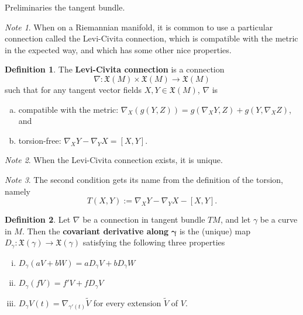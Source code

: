 \documentclass{article}
\newcommand{\fn}[3]{#1 \colon #2 \rightarrow #3}
\theoremstyle{definition}
\newtheorem{definition}{Definition}[section]
\theoremstyle{remark}
\newtheorem{remark}{Note}[section]
\begin{document}
\begin{section}{Preliminaries}
  the tangent bundle.
  \begin{remark}
    When on a Riemannian manifold, it is common to use a particular connection
    called the Levi-Civita connection, which is compatible with the metric in
    the expected way, and which has some other nice properties.
  \end{remark}
  \begin{definition}
    The \textbf{Levi-Civita connection} is a connection
    \[
      \fn\nabla {\mathfrak X(M) \times \mathfrak X(M)} {\mathfrak X(M)}
    \] such that for any tangent vector fields $X, Y \in \mathfrak X(M)$,
    $\nabla$ is
    \begin{enumerate}[(a)]
      \item compatible with the metric: $\nabla_X(g(Y, Z)) = g(\nabla_XY, Z) + g(Y, \nabla_XZ)$, and
      \item torsion-free: $\nabla_XY - \nabla_YX = [X, Y]$.
    \end{enumerate}
  \end{definition}
  \begin{remark}
    When the Levi-Civita connection exists, it is unique.
  \end{remark}
  \begin{remark}
    The second condition gets its name from the definition of the torsion,
    namely \[
      T(X, Y):= \nabla_XY - \nabla_YX - [X, Y].
    \]
  \end{remark}
  \begin{definition}
    Let $\nabla$ be a connection in tangent bundle $TM$, and let $\gamma$ be a
    curve in $M$. Then the \textbf{covariant derivative along} $\boldsymbol{\gamma}$ is the
    (unique) map $
      \fn {D_\gamma }{\mathfrak X(\gamma)}{\mathfrak X(\gamma)}
    $ satisfying the following three properties \begin{enumerate}[(i)]
      \item $\displaystyle D_\gamma (aV + bW) = aD_\gamma V + bD_\gamma W$
      \item $\displaystyle D_\gamma (fV) = f'V + fD_\gamma V$
      \item $\displaystyle D_\gamma V(t) = \nabla_{\gamma'(t)}\widetilde{V}$ for every extension $\widetilde V$ of $V$.

\end{enumerate}
\end{definition}
\end{section}
\end{document}
